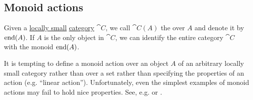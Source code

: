 \subsection{Monoid actions}\label{subsec:monoid_actions}

\begin{definition}\label{def:endomorphism_monoid}
  Given a \hyperref[def:category_cardinality]{locally small} \hyperref[def:category]{category} \( \cat{C} \), we call \( \cat{C}(A) \) the  over \( A \) and denote it by \( \operatorname{end}(A) \). If \( A \) is the only object in \( \cat{C} \), we can identify the entire category \( \cat{C} \) with the monoid \( \operatorname{end}(A) \).
\end{definition}

\begin{remark}\label{rem:monoid_action_endomorphisms}
  It is tempting to define a monoid action over an object \( A \) of an arbitrary locally small category rather than over a set rather than specifying the properties of an action (e.g. \enquote{linear action}). Unfortunately, even the simplest examples of monoid actions may fail to hold nice properties. See, e.g.  or .
\end{remark}

